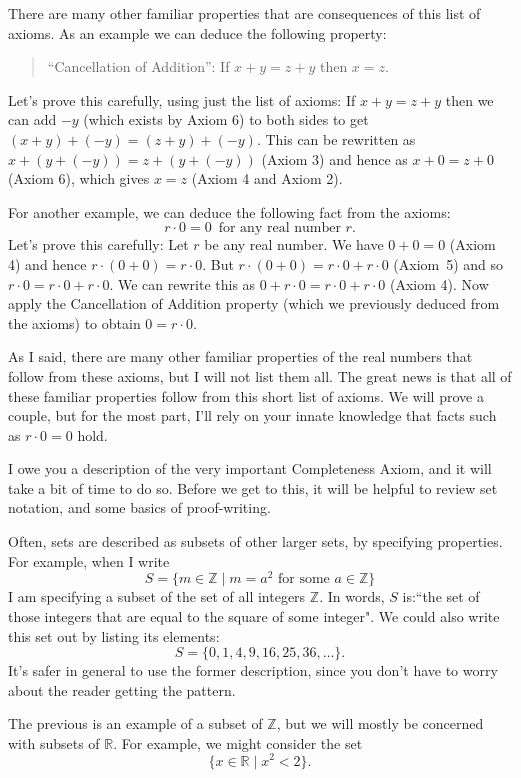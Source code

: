 \documentclass[12pt]{amsart}
\newcommand{\R}{{\mathbb{R}}}
\newcommand{\Z}{\mathbb{Z}}
\numberwithin{equation}{section}
\theoremstyle{plain} %
\theoremstyle{definition}
\theoremstyle{remark}
\begin{document}
There are many other familiar properties that are consequences of this list of axioms. As an example we can deduce the following property:
\begin{quote}
  ``Cancellation of Addition'': If $x + y = z + y$ then $x = z$.
\end{quote}
Let's prove this carefully, using just the list of axioms: If $x + y = z + y$ then we can add $-y$ (which exists by Axiom 6) to both sides to get
$(x + y) + (-y) = (z + y) + (-y)$. This can be rewritten as $x + (y + (-y)) = z + (y + (-y))$ (Axiom 3) and hence as $x + 0 = z + 0$ (Axiom 6), which gives $x = z$ (Axiom 4 and Axiom 2).



For another example, we can deduce the following fact from the axioms:
$$
r \cdot 0 = 0 \, \text{ for any real number $r$}.
$$
Let's prove this carefully: Let $r$ be any real number. We have $0 +  0 = 0$ (Axiom 4) and hence $r \cdot (0 + 0) = r \cdot 0$. But
$r \cdot (0 + 0) = r \cdot 0 + r \cdot 0$ (Axiom~5) and so $r \cdot 0 = r \cdot 0 + r \cdot 0$. We can rewrite this as
$0 + r \cdot 0 = r \cdot 0 + r \cdot 0$ (Axiom 4). Now apply the Cancellation of Addition property (which we previously deduced from the axioms) to obtain
$0 = r \cdot 0$.

As I said, there are many other familiar properties of the real numbers that follow from these axioms, but I will not list them all. The great news is that all of these familiar properties follow from this short list of axioms. We will prove a couple, but for the most part, I'll rely on your innate knowledge that
facts such as $r \cdot 0 = 0$ hold. 




I owe you a description of the very important Completeness Axiom, and 
it will take a bit of time to do so. Before we get to this, it will be helpful to review set notation, and some basics of proof-writing.

Often, sets are described as subsets of other larger sets, by specifying properties. For example, when I write
$$
S = \{ m \in \Z \mid m = a^2 \text{ for some $a \in \Z$} \}
$$
I am specifying a subset of the set of all integers $\Z$. 
In words, $S$ is:``the set of those integers that are equal to the square of some integer". We could also write this set out by listing its elements: \[S = \{0,1,4,9,16,25,36, \dots \}.\]
 It's safer in general to use the former description, since you don't have to worry about the reader getting the pattern.


The previous is an example of a subset of $\Z$, but we will mostly be concerned with subsets of $\R$. For example, we might consider the set
$$
\{x \in \R \mid x^2 < 2\}. 
$$
\end{document}
